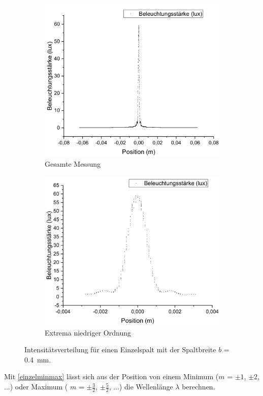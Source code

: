 \documentclass[
	a4paper,
	12pt,
	pagesize,
	ngerman
]{scrartcl}
\begin{document}
	\begin{figure}[H]
		\centering
		\begin{subfigure}{.5\textwidth}
			\centering
			\includegraphics[width=1\linewidth]{Einzelspalt0-400mm}
			\caption{Gesamte Messung}	
		\end{subfigure}%
		\begin{subfigure}{.5\textwidth}
			\centering
			\includegraphics[width=1\linewidth]{Einzelspalt0-400mmZOOM}
			\caption{Extrema niedriger Ordnung}
		\end{subfigure}
		\caption{Intensitätsverteilung für einen Einzelspalt mit der Spaltbreite $b$ = \SI{0,4}{mm}.}
		\label{Einzelspalt0-400mm}
	\end{figure}	
	Mit \cref{einzelminmax} lässt sich aus der Position von einem Minimum ($m$ = $\pm1$, $\pm 2$, ...) oder Maximum ( $m$ = $\pm\frac{3}{2}$, $\pm \frac{5}{2}$, ...) die Wellenlänge $\lambda$ berechnen. 
	
\end{document}
